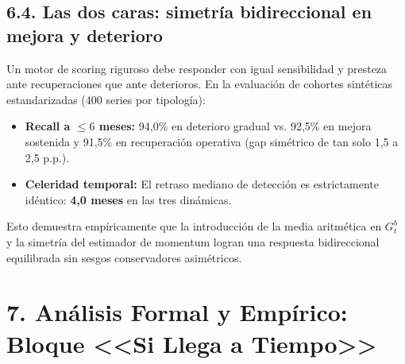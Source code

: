 \documentclass[10pt,a4paper]{article}
\begin{document}
\subsection*{6.4. Las dos caras: simetría bidireccional en mejora y deterioro}
Un motor de scoring riguroso debe responder con igual sensibilidad y presteza ante recuperaciones que ante deterioros. En la evaluación de cohortes sintéticas estandarizadas (400 series por tipología):
\begin{itemize}[leftmargin=*, noitemsep]
  \item \textbf{Recall a $\le 6$ meses:} 94,0\% en deterioro gradual vs. 92,5\% en mejora sostenida y 91,5\% en recuperación operativa (gap simétrico de tan solo 1,5 a 2,5 p.p.).
  \item \textbf{Celeridad temporal:} El retraso mediano de detección es estrictamente idéntico: \textbf{4,0 meses} en las tres dinámicas.
\end{itemize}
Esto demuestra empíricamente que la introducción de la media aritmética en $G_t^b$ y la simetría del estimador de momentum logran una respuesta bidireccional equilibrada sin sesgos conservadores asimétricos.

\section*{7. Análisis Formal y Empírico: Bloque <<Si Llega a Tiempo>>}
\end{document}
